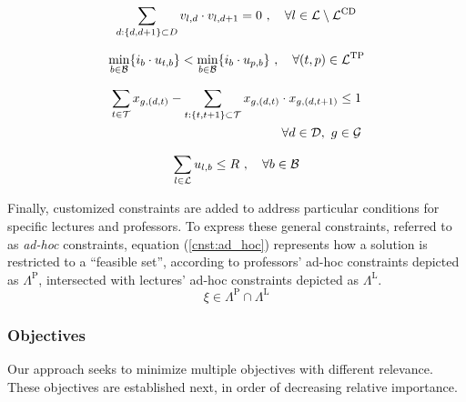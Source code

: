 \begin{equation}
    \sum_{d:\{d,d+1\}\subset D} v_{l,d} \cdot v_{l,d+1} = 0 \ , \quad \forall l \in \mathcal{L} \setminus \mathcal{L}^\text{CD}
    \label{cnst:consecutive_days}
\end{equation}

\begin{equation}
    \min_{b\in\mathcal{B}} \{i_b \cdot u_{t,b} \} < \min_{b\in\mathcal{B}} \{i_b \cdot u_{p,b}\} \ , \quad \forall (t,p) \in \mathcal{L}^\text{TP}
    \label{cnst:theo_prac}
\end{equation}

\begin{equation}
    \begin{split}
        \sum_{t\in\mathcal{T}} x_{g,(d,t)} - \sum_{t:\{t,t+1\}\subset\mathcal{T}} x_{g,(d,t)} \cdot x_{g,(d,t+1)} \leq 1 \\
        \quad \forall d \in \mathcal{D}, \ g\in\mathcal{G}
    \end{split}
    \label{cnst:consecutive_group_hours}
\end{equation}

\begin{equation}
    \sum_{l\in\mathcal{L}} u_{l,b} \leq R \ , \quad \forall b\in\mathcal{B}
    \label{cnst:rooms}
\end{equation}

Finally, customized constraints are added to address particular conditions for specific lectures and professors. To express these general constraints, referred to as \textit{ad-hoc} constraints, equation (\ref{cnst:ad_hoc}) represents how a solution is restricted to a ``feasible set'', according to professors' ad-hoc constraints depicted as $\Lambda^\text{P}$, intersected with lectures' ad-hoc constraints depicted as $\Lambda^\text{L}$.
\begin{equation}
    \xi \in \Lambda^\text{P} \cap \Lambda^\text{L}
    \label{cnst:ad_hoc}
\end{equation}


\subsubsection{Objectives}

    Our approach seeks to minimize multiple objectives with different relevance. These objectives are established next, in order of decreasing relative importance.
    
